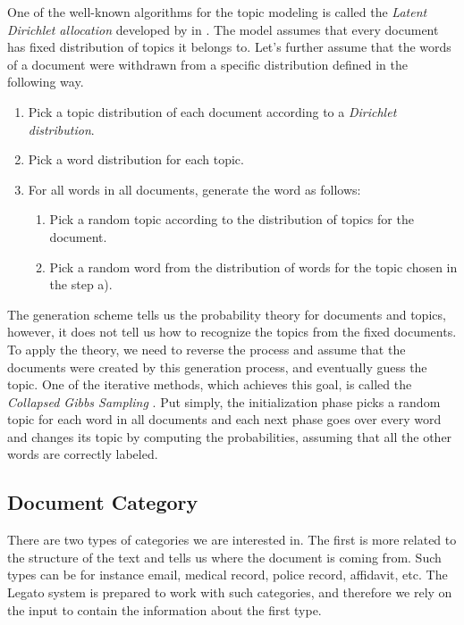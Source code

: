 \documentclass[
  digital, %
  table,   %
  lof,     %
  lot,     %
]{fithesis3}
\begin{document}
One of the well-known algorithms for the topic modeling is called the \textit{Latent Dirichlet allocation} developed by \citeauthor{blei2003latent} in \citeyear{blei2003latent} \cite{blei2003latent}.
The model assumes that every document has fixed distribution of topics it belongs to.
Let's further assume that the words of a document were withdrawn from a specific distribution defined in the following way.
\begin{enumerate}
\item Pick a topic distribution of each document according to a \textit{Dirichlet distribution}.
\item Pick a word distribution for each topic.
\item For all words in all documents, generate the word as follows:
\begin{enumerate}
  \item Pick a random topic according to the distribution of topics for the document.
  \item Pick a random word from the distribution of words for the topic chosen in the step a).
\end{enumerate}
\end{enumerate}
The generation scheme tells us the probability theory for documents and topics, however, it does not tell us how to recognize the topics from the fixed documents.
To apply the theory, we need to reverse the process and assume that the documents were created by this generation process, and eventually guess the topic.
One of the iterative methods, which achieves this goal, is called the \textit{Collapsed Gibbs Sampling} \cite{xiao2010efficient}.
Put simply, the initialization phase picks a random topic for each word in all documents and each next phase goes over every word and changes its topic by computing the probabilities, assuming that all the other words are correctly labeled.



\subsection{Document Category}
There are two types of categories we are interested in.
The first is more related to the structure of the text and tells us where the document is coming from. 
Such types can be for instance email, medical record, police record, affidavit, etc.
The Legato system is prepared to work with such categories, and therefore we rely on the input to contain the information about the first type.
\end{document}
